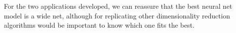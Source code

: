 \documentclass[a4paper,11pt,spanish]{report}
\begin{document}
For the two applications developed, we can reassure that the best neural net model is a wide net, although for replicating other dimensionality reduction algorithms would be important to know which one fits the best.




\label{chap:bib}

\nocite{*}

% 


\end{document}
